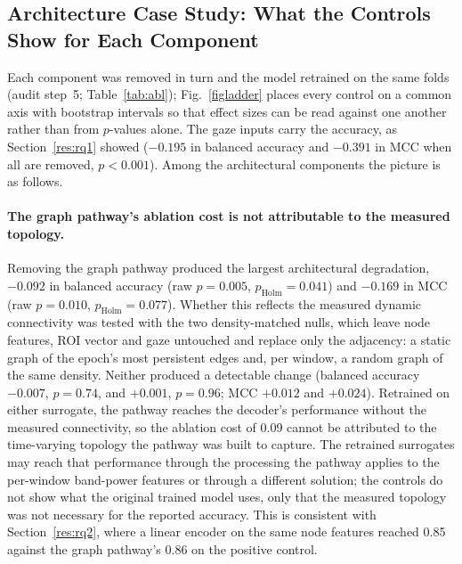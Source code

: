 \documentclass[pdflatex,sn-basic,Numbered,twocolumn,iicol]{sn-jnl}
\theoremstyle{thmstyleone}%
\theoremstyle{thmstyletwo}%
\theoremstyle{thmstylethree}%
\begin{document}
\subsection{Architecture Case Study: What the Controls Show for Each Component}\label{res:rq3}

Each component was removed in turn and the model retrained on the same folds (audit step~5; Table~\ref{tab:abl}); Fig.~\ref{figladder} places every control on a common axis with bootstrap intervals so that effect sizes can be read against one another rather than from $p$-values alone. The gaze inputs carry the accuracy, as Section~\ref{res:rq1} showed ($-0.195$ in balanced accuracy and $-0.391$ in MCC when all are removed, $p<0.001$). Among the architectural components the picture is as follows.

\paragraph{The graph pathway's ablation cost is not attributable to the measured topology.} Removing the graph pathway produced the largest architectural degradation, $-0.092$ in balanced accuracy (raw $p=0.005$, $p_{\mathrm{Holm}}=0.041$) and $-0.169$ in MCC (raw $p=0.010$, $p_{\mathrm{Holm}}=0.077$). Whether this reflects the measured dynamic connectivity was tested with the two density-matched nulls, which leave node features, ROI vector and gaze untouched and replace only the adjacency: a static graph of the epoch's most persistent edges and, per window, a random graph of the same density. Neither produced a detectable change (balanced accuracy $-0.007$, $p=0.74$, and $+0.001$, $p=0.96$; MCC $+0.012$ and $+0.024$). Retrained on either surrogate, the pathway reaches the decoder's performance without the measured connectivity, so the ablation cost of 0.09 cannot be attributed to the time-varying topology the pathway was built to capture. The retrained surrogates may reach that performance through the processing the pathway applies to the per-window band-power features or through a different solution; the controls do not show what the original trained model uses, only that the measured topology was not necessary for the reported accuracy. This is consistent with Section~\ref{res:rq2}, where a linear encoder on the same node features reached 0.85 against the graph pathway's 0.86 on the positive control.
\end{document}
